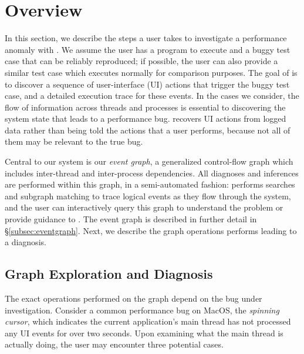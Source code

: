\section{Overview} \label{sec:overview}


In this section, we describe the steps a user takes to investigate a
performance anomaly with \xxx. We assume the user has a program to execute and
a buggy test case that can be reliably reproduced; if possible, the user can
also provide a similar test case which executes normally for comparison
purposes. The goal of \xxx is to discover a sequence of user-interface (UI)
actions that trigger the buggy test case, and a detailed execution trace for
these events. In the cases we consider, the flow of information across threads
and processes is essential to discovering the system state that leads to a
performance bug. \xxx recovers UI actions from logged data rather than being
told the actions that a user performs, because not all of them may be relevant
to the true bug.

Central to our system is our \emph{event graph}, a generalized control-flow
graph which includes inter-thread and inter-process dependencies. All diagnoses
and inferences are performed within this graph, in a semi-automated fashion:
\xxx performs searches and subgraph matching to trace logical events as they
flow through the system, and the user can interactively query this graph to
understand the problem or provide guidance to \xxx. The event graph is
described in further detail in \S\ref{subsec:eventgraph}. Next, we describe the
graph operations \xxx performs leading to a diagnosis.

\subsection{Graph Exploration and Diagnosis} \label{subsec:debug}

The exact operations performed on the graph depend on the bug under
investigation. Consider a common performance bug on MacOS, the \emph{spinning
cursor}, which indicates the current application's main thread has not
processed any UI events for over two seconds. Upon examining what the main
thread is actually doing, the user may encounter three potential cases.


